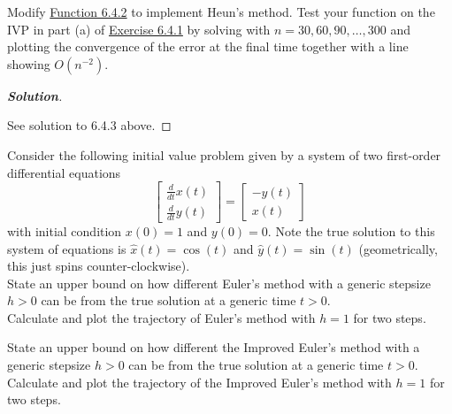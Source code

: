\documentclass[11pt]{article}
\newenvironment{problem}[2][Question]{\begin{trivlist}
\item[\hskip \labelsep {\bfseries #1}\hskip \labelsep {\bfseries #2.}]}{\end{trivlist}}
\newenvironment{solution}{%
  \begin{proof}[\textbf{Solution}]$ $\par\nobreak\ignorespaces
}{%
  \end{proof}
}
\theoremstyle{definition}
\begin{document}
\begin{problem}{6.4.5}
Modify \href{https://fncbook.com/rk/#function-rk4}{Function 6.4.2} to implement Heun's method. Test your function on the IVP in part (a) of \href{https://fncbook.com/rk/#problem-rk-byhand}{Exercise 6.4.1} by solving with $n = 30, 60, 90, \ldots, 300$ and plotting the convergence of the error at the final time together with a line showing $O(n^{-2})$.
\end{problem}
\begin{solution}
    See solution to 6.4.3 above.
\end{solution}



\begin{problem}{Q2}
Consider the following initial value problem given by a system of two first-order differential equations
$$
\begin{bmatrix}
    \frac{d}{dt} x(t)\\ \frac{d}{dt} y(t) 
\end{bmatrix} = \begin{bmatrix}
    -y(t)\\ x(t) 
\end{bmatrix}
$$
with initial condition $x(0)=1$ and $y(0)=0$. Note the true solution to this system of equations is $\hat x(t)=\cos(t)$ and $\hat y(t) = \sin(t)$ (geometrically, this just spins counter-clockwise).\\

State an upper bound on how different Euler's method with a generic stepsize $h>0$ can be from the true solution at a generic time $t>0$. \\ 
Calculate and plot the trajectory of Euler's method with $h=1$ for two steps.

\vskip 3cm


 State an upper bound on how different the Improved Euler's method with a generic stepsize $h>0$ can be from the true solution at a generic time $t>0$. \\
Calculate and plot the trajectory of the Improved Euler's method with $h=1$ for two steps.
\end{problem}
\end{document}
